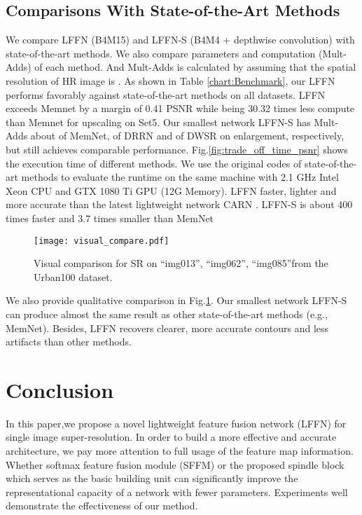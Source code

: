 \documentclass[journal]{IEEEtran}
\begin{document}
\subsection{Comparisons With State-of-the-Art Methods}

We compare LFFN (B4M15) and LFFN-S (B4M4 + depthwise convolution) with state-of-the-art methods. We also compare parameters and computation (Mult-Adds) of each method. And Mult-Adds is calculated by assuming that the spatial resolution of HR image is . As shown in Table \ref{chart:Benchmark}, our LFFN performs favorably against state-of-the-art methods on all datasets. LFFN exceeds Memnet\cite{tai2017memnet} by a margin of 0.41 PSNR while being 30.32 times less compute than Memnet for upscaling  on Set5. Our smallest network LFFN-S has Mult-Adds about  of MemNet,  of DRRN and  of DWSR on  enlargement, respectively, but still achieves comparable performance. Fig.\ref{fig:trade_off_time_psnr} shows the execution time of different methods. We use the original codes of state-of-the-art methods to evaluate the runtime on the same machine with 2.1 GHz Intel Xeon CPU and GTX 1080 Ti GPU (12G Memory). LFFN faster, lighter and more accurate than the latest lightweight network CARN \cite{ahn2018fast}. LFFN-S is about 400 times faster and 3.7 times smaller than MemNet

\begin{figure}[t]
\centering
\texttt{[image: visual\_compare.pdf]}
\caption{Visual comparison for  SR on  ``img013'', ``img062'', ``img085''from the Urban100 dataset.}
\label{visual_compare}
\end{figure}

\par We also provide qualitative comparison in Fig.\ref{visual_compare}. Our smallest network LFFN-S can produce almost the same result as other state-of-the-art methods (e.g., MemNet). Besides, LFFN recovers clearer, more accurate contours and less artifacts than other methods. 

\section{Conclusion}
In this paper,we propose a novel lightweight feature fusion network (LFFN) for single image super-resolution. In order to build a more effective and accurate architecture, we pay more attention to full usage of the feature map information. Whether softmax feature fusion module (SFFM) or the proposed spindle block which serves as the basic building unit can significantly improve the representational capacity of a network with fewer parameters. Experiments well demonstrate the effectiveness of our method.
\end{document}
